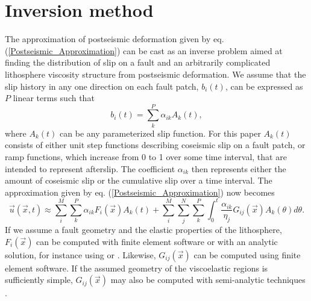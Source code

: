 \section{Inversion method}\label{InverseMethod}
The approximation of postseismic deformation given by eq.
(\ref{Postseismic_Approximation}) can be cast as an inverse problem
aimed at finding the distribution of slip on a fault and an
arbitrarily complicated lithosphere viscosity structure from
postseismic deformation. We assume that the slip history in any one
direction on each fault patch, $b_i(t)$, can be expressed as $P$ linear
terms such that
\begin{equation}
  b_i(t) = \sum_k^P \alpha_{ik}A_k(t),
\end{equation}
where $A_k(t)$ can be any parameterized slip function.  For this
paper $A_k(t)$ consists of either unit step functions describing
coseismic slip on a fault patch, or ramp functions, which increase
from 0 to 1 over some time interval, that are intended to represent
afterslip.  The coefficient $\alpha_{ik}$ then represents either the
amount of coseismic slip or the cumulative slip over a time interval.
The approximation given by eq. (\ref{Postseismic_Approximation}) now
becomes
\begin{equation}\label{Postseismic_Approximation2}
  \vec{u}(\vec{x},t) \approx
  \sum_i^M\sum_k^P\alpha_{ik}F_i(\vec{x})A_k(t) +
  \sum_i^M\sum_j^N\sum_k^P\int_0^t\frac{\alpha_{ik}}{\eta_j}G_{ij}(\vec{x})A_k(\theta)d\theta.
\end{equation}
If we assume a fault geometry and the elastic properties of the
lithosphere, $F_i(\vec{x})$ can be computed with finite element
software or with an analytic solution, for instance using
\citet{Okada1992} or \citet{Meade2007}. Likewise, $G_{ij}(\vec{x})$ can be
computed using finite element software.  If the assumed geometry of
the viscoelastic regions is sufficiently simple, $G_{ij}(\vec{x})$ may
also be computed with semi-analytic techniques
\citep[e.g.][]{Pollitz1997,Fukahata2006,Barbot2010}.

